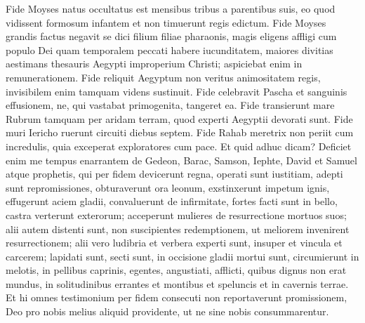 \begin{biblechapter}
\begin{biblechapter}
\begin{biblechapter}
\begin{biblechapter}
\begin{biblechapter}
\begin{biblechapter}
\begin{biblechapter}
\begin{biblechapter}
\begin{biblechapter}
\begin{biblechapter}
\begin{biblechapter}
 \verse Fide Moyses natus occultatus est mensibus tribus a parentibus suis, eo quod vidissent formosum infantem et non timuerunt regis edictum.
 \verse Fide Moyses grandis factus negavit se dici filium filiae pharaonis, 
\verse magis eligens affligi cum populo Dei quam temporalem peccati habere iucunditatem, 
\verse maiores divitias aestimans thesauris Aegypti improperium Christi; aspiciebat enim in remunerationem.
 \verse Fide reliquit Aegyptum non veritus animositatem regis, invisibilem enim tamquam videns sustinuit.
 \verse Fide celebravit Pascha et sanguinis effusionem, ne, qui vastabat primogenita, tangeret ea.
 \verse Fide transierunt mare Rubrum tamquam per aridam terram, quod experti Aegyptii devorati sunt.
 \verse Fide muri Iericho ruerunt circuiti diebus septem.
 \verse Fide Rahab meretrix non periit cum incredulis, quia exceperat exploratores cum pace.
 \verse Et quid adhuc dicam? Deficiet enim me tempus enarrantem de Gedeon, Barac, Samson, Iephte, David et Samuel atque prophetis, 
\verse qui per fidem devicerunt regna, operati sunt iustitiam, adepti sunt repromissiones, obturaverunt ora leonum, 
\verse exstinxerunt impetum ignis, effugerunt aciem gladii, convaluerunt de infirmitate, fortes facti sunt in bello, castra verterunt exterorum; 
\verse acceperunt mulieres de resurrectione mortuos suos; alii autem distenti sunt, non suscipientes redemptionem, ut meliorem invenirent resurrectionem; 
\verse alii vero ludibria et verbera experti sunt, insuper et vincula et carcerem; 
\verse lapidati sunt, secti sunt, in occisione gladii mortui sunt, circumierunt in melotis, in pellibus caprinis, egentes, angustiati, afflicti, 
\verse quibus dignus non erat mundus, in solitudinibus errantes et montibus et speluncis et in cavernis terrae.
 \verse Et hi omnes testimonium per fidem consecuti non reportaverunt promissionem, 
\verse Deo pro nobis melius aliquid providente, ut ne sine nobis consummarentur.
 

\end{biblechapter}
\end{biblechapter}
\end{biblechapter}
\end{biblechapter}
\end{biblechapter}
\end{biblechapter}
\end{biblechapter}
\end{biblechapter}
\end{biblechapter}
\end{biblechapter}
\end{biblechapter}
